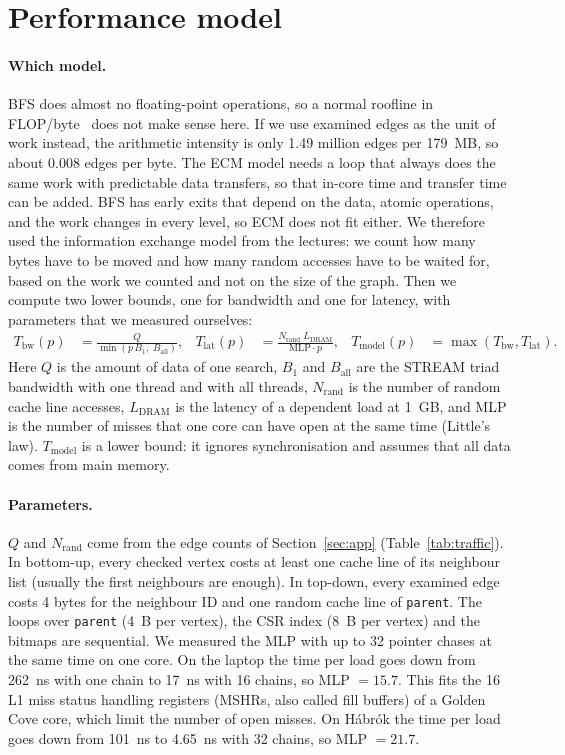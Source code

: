 \section{Performance model}
\label{sec:model}

\paragraph{Which model.} BFS does almost no floating-point operations, so a normal roofline
in FLOP/byte~\cite{roofline} does not make sense here. If we use examined edges as the unit of
work instead, the arithmetic intensity is only 1.49 million edges per \SI{179}{MB}, so about
\num{0.008} edges per byte. The ECM model needs a loop that always does the same work with
predictable data transfers, so that in-core time and transfer time can be added. BFS has early
exits that depend on the data, atomic operations, and the work changes in every level, so
ECM does not fit either. We therefore used the information exchange model from the lectures:
we count how many bytes have to be moved and how many random accesses have to be waited
for, based on the work we counted and not on the size of the graph. Then we compute two
lower bounds, one for bandwidth and one for latency, with parameters that we measured
ourselves:
\begin{align*}
T_\text{bw}(p)  &= \frac{Q}{\min(p\,B_1,\;B_\text{all})}, &
T_\text{lat}(p) &= \frac{N_\text{rand}\; L_\text{DRAM}}{\text{MLP}\cdot p}, &
T_\text{model}(p) &= \max(T_\text{bw}, T_\text{lat}).
\end{align*}
Here $Q$ is the amount of data of one search, $B_1$ and $B_\text{all}$ are the STREAM triad
bandwidth with one thread and with all threads, $N_\text{rand}$ is the number of random cache
line accesses, $L_\text{DRAM}$ is the latency of a dependent load at \SI{1}{GB}, and MLP is
the number of misses that one core can have open at the same time (Little's law).
$T_\text{model}$ is a lower bound: it ignores synchronisation and assumes that all data comes
from main memory.

\paragraph{Parameters.} $Q$ and $N_\text{rand}$ come from the edge counts of
Section~\ref{sec:app} (Table~\ref{tab:traffic}). In bottom-up, every checked vertex costs at
least one cache line of its neighbour list (usually the first neighbours are enough). In
top-down, every examined edge costs 4 bytes for the neighbour ID and one random cache line of
\texttt{parent}. The loops over \texttt{parent} (\SI{4}{B} per vertex), the CSR index
(\SI{8}{B} per vertex) and the bitmaps are sequential. We measured the MLP with up to 32
pointer chases at the same time on one core. On the laptop the time per load goes down from
\SI{262}{ns} with one chain to \SI{17}{ns} with 16 chains, so MLP $= 15.7$. This fits the 16
L1 miss status handling registers (MSHRs, also called fill buffers) of a Golden Cove core,
which limit the number of open misses. On Hábrók the time per load goes down from
\SI{101}{ns} to \SI{4.65}{ns} with 32 chains, so MLP $= 21.7$.

